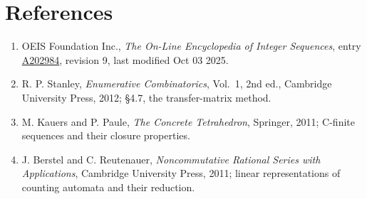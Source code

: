 \documentclass[11pt]{article}
\theoremstyle{definition}
\begin{document}
\section{References}

\begin{enumerate}

\item OEIS Foundation Inc., \emph{The On-Line Encyclopedia of Integer Sequences}, entry \href{https://oeis.org/A202984}{A202984}, revision 9, last modified Oct 03 2025.

\item R. P. Stanley, \emph{Enumerative Combinatorics}, Vol.~1, 2nd ed., Cambridge University Press, 2012; \S4.7, the transfer-matrix method.

\item M. Kauers and P. Paule, \emph{The Concrete Tetrahedron}, Springer, 2011; C-finite sequences and their closure properties.

\item J. Berstel and C. Reutenauer, \emph{Noncommutative Rational Series with Applications}, Cambridge University Press, 2011; linear representations of counting automata and their reduction.

\end{enumerate}
\end{document}
